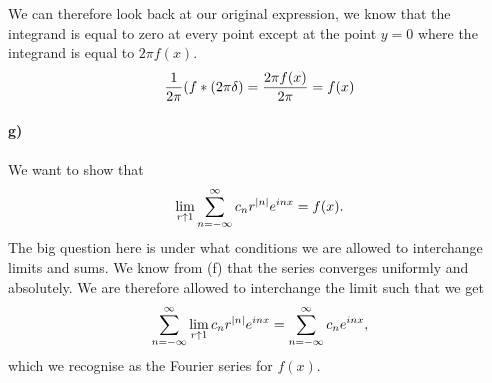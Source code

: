 \documentclass[a4paper]{article}
\begin{document}
We can therefore look back at our original expression, we know that the
integrand is equal to zero at every point except at the point $y = 0$ where the
integrand is equal to $2\pi f(x)$.
\begin{equation}
  \notag
  \frac{1}{2\pi} (f * (2\pi\delta) = \frac{2\pi f(x)}{2\pi} = f(x)
\end{equation}

\paragraph{g)}
We want to show that
\begin{equation}
  \notag
  \lim\limits_{r\uparrow 1}\sum_{n=-\infty}^{\infty} c_nr^{|n|}e^{inx} = f(x).
\end{equation}
The big question here is under what conditions we are allowed to interchange limits and sums.
We know from (f) that the series converges uniformly and absolutely. We are therefore allowed to interchange the limit
such that we get
\begin{equation}
  \notag
  \sum_{n=-\infty}^{\infty}\lim\limits_{r\uparrow 1} c_nr^{|n|}e^{inx} = \sum_{n=-\infty}^{\infty}c_ne^{inx},
\end{equation}
which we recognise as the Fourier series for $f(x)$.
\end{document}
